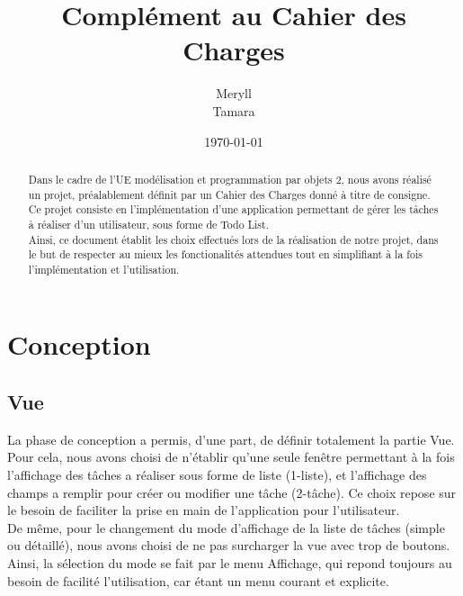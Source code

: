 \documentclass[a4paper,10pt]{article}
\author{Meryll \bsc{Essig}\\ Tamara \bsc{Rocacher}}
\date{\today}
\title{Complément au Cahier des Charges}
\begin{document}
\vfill
\maketitle
\vfill
\renewcommand{\abstractname}{Introduction}
\newpage
\begin{abstract}
Dans le cadre de l'UE modélisation et programmation par objets 2, nous avons réalisé un projet, préalablement définit par un Cahier des Charges donné à titre de consigne.\\
Ce projet consiste en l'implémentation d'une application permettant de gérer les tâches à réaliser d'un utilisateur, sous forme de Todo List.\\
Ainsi, ce document établit les choix effectués lors de la réalisation de notre projet, dans le but de respecter au mieux les fonctionalités attendues tout en simplifiant à la fois l'implémentation et l'utilisation.
\end{abstract}
\vfill
\newpage
\renewcommand{\contentsname}{Sommaire}
\tableofcontents

\newpage

\section{Conception}
\subsection{Vue}
La phase de conception a permis, d'une part, de définir totalement la partie Vue.
Pour cela, nous avons choisi de n'établir qu'une seule fenêtre permettant à la fois l'affichage des tâches a réaliser sous forme de liste (1-liste), et l'affichage des champs a remplir pour créer ou modifier une tâche (2-tâche).
Ce choix repose sur le besoin de faciliter la prise en main de l'application pour l'utilisateur.
\\
De même, pour le changement du mode d'affichage de la liste de tâches (simple ou détaillé), nous avons choisi de ne pas surcharger la vue avec trop de boutons. Ainsi, la sélection du mode se fait par le menu Affichage, qui repond toujours au besoin de facilité l'utilisation, car étant un menu courant et explicite.
\\
\end{document}
